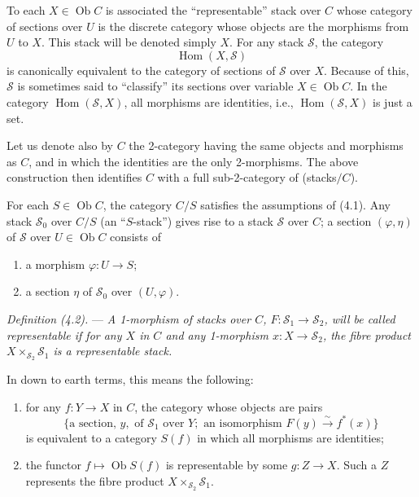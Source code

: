 \documentclass[10pt]{article}
\newcommand{\Hom}{\operatorname{Hom}}
\begin{document}
To each $X\in\operatorname{Ob} C$ is associated the ``representable'' stack over $C$ whose category of sections over $U$ is the discrete category whose objects are the morphisms from $U$ to $X$. This stack will be denoted simply $X$. For any stack $\mathscr S$, the category
\[
\Hom(X,\mathscr S)
\]
is canonically equivalent to the category of sections of $\mathscr S$ over $X$. Because of this, $\mathscr S$ is sometimes said to ``classify'' its sections over variable $X\in\operatorname{Ob} C$. In the category $\Hom(\mathscr S,X)$, all morphisms are identities, i.e., $\Hom(\mathscr S,X)$ is just a set.

Let us denote also by $C$ the 2-category having the same objects and morphisms as $C$, and in which the identities are the only 2-morphisms. The above construction then identifies $C$ with a full sub-2-category of (stacks$/C$).

For each $S\in\operatorname{Ob} C$, the category $C/S$ satisfies the assumptions of (4.1). Any stack $\mathscr S_0$ over $C/S$ (an ``$S$-stack'') gives rise to a stack $\mathscr S$ over $C$; a section $(\varphi,\eta)$ of $\mathscr S$ over $U\in\operatorname{Ob} C$ consists of
\begin{enumerate}[label=(\roman*)]
\item a morphism $\varphi:U\to S$;
\item a section $\eta$ of $\mathscr S_0$ over $(U,\varphi)$.
\end{enumerate}

\medskip
\noindent\emph{Definition (4.2).} --- \emph{A 1-morphism of stacks over $C$, $F:\mathscr S_1\to\mathscr S_2$, will be called representable if for any $X$ in $C$ and any 1-morphism $x:X\to\mathscr S_2$, the fibre product $X\times_{\mathscr S_2}\mathscr S_1$ is a representable stack.}

In down to earth terms, this means the following:
\begin{enumerate}[label=(\roman*)]
\item for any $f:Y\to X$ in $C$, the category whose objects are pairs
\[
\{\text{a section, }y,\text{ of }\mathscr S_1\text{ over }Y;\text{ an isomorphism }F(y)\xrightarrow{\sim}f^*(x)\}
\]
is equivalent to a category $S(f)$ in which all morphisms are identities;
\item the functor $f\mapsto\operatorname{Ob} S(f)$ is representable by some $g:Z\to X$. Such a $Z$ represents the fibre product $X\times_{\mathscr S_2}\mathscr S_1$.
\end{enumerate}
\end{document}
